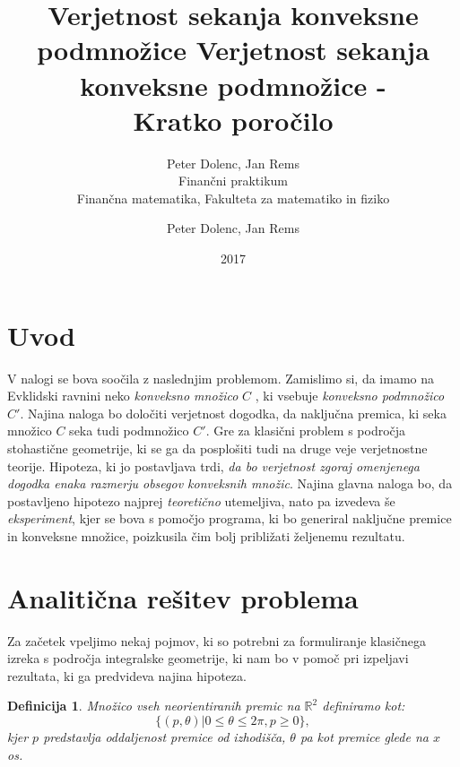 \documentclass[a4paper]{article}
\title{Verjetnost sekanja konveksne podmnožice}
\author{Peter Dolenc, Jan Rems \\ Finančni praktikum \\ Finančna matematika, Fakulteta za matematiko in fiziko}
\date{2017}
\newtheorem{definicija}{Definicija}
\begin{document}
\title{%
  Verjetnost sekanja konveksne podmnožice -\\
   \large Kratko poročilo \\}

\author{Peter Dolenc, Jan Rems}

\maketitle

\pagebreak

\section{Uvod}


V nalogi se bova soočila z naslednjim problemom. Zamislimo si, da imamo na Evklidski ravnini neko \textit{konveksno množico} $C$ , ki vsebuje \textit{konveksno podmnožico } $C'$. Najina naloga bo določiti verjetnost dogodka, da naključna premica, ki seka množico $C$ seka tudi podmnožico $C'$. Gre za klasični problem s področja stohastične geometrije, ki se ga da posplošiti tudi na druge veje verjetnostne teorije. Hipoteza, ki jo postavljava trdi, \textit{da bo verjetnost zgoraj omenjenega dogodka enaka razmerju obsegov konveksnih množic}. Najina glavna naloga bo, da postavljeno hipotezo najprej \textit{teoretično} utemeljiva, nato pa izvedeva še \textit{eksperiment}, kjer se bova s pomočjo programa, ki bo generiral naključne premice in konveksne množice, poizkusila čim bolj približati željenemu rezultatu. 


\vspace{4 mm}


\section{Analitična rešitev problema}

Za začetek vpeljimo nekaj pojmov, ki so potrebni za formuliranje klasičnega izreka s področja integralske geometrije, ki nam bo v pomoč pri izpeljavi rezultata, ki ga predvideva najina hipoteza.

\begin{definicija}
Množico vseh neorientiranih premic na $\mathbb{R}^2$ definiramo kot: $$ \{ (p,\theta)|0 \le \theta \le 2 \pi , p \ge 0\},$$ kjer $p$ predstavlja oddaljenost premice od izhodišča, $\theta$ pa kot premice glede na $x$ os.
\end{definicija}

\vspace{3 mm}
\end{document}
